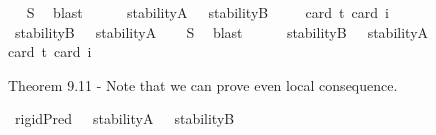 \begin{isabellebody}
\isadelimproof
\ %
\endisadelimproof
%
\isatagproof
{}\isamarkupfalse%
\ S{}\ \isamarkupfalse%
\ blast%
\endisatagproof
{\isafoldproof}%
%
\isadelimproof
%
\endisadelimproof
\ \ \ \ \isanewline
{}\isamarkupfalse%
\ {\isachardoublequoteopen}{\isasymlfloor}stabilityA\ {\isacharparenleft}{\isasymtau}{\isacharcolon}{\isacharcolon}{\isasymup}{\isasymlangle}{\isasymzero}{\isasymrangle}{\isacharparenright}\ \isactrlbold {\isasymrightarrow}\ stabilityB\ {\isasymtau}{\isasymrfloor}{\isachardoublequoteclose}\ \isanewline
\ \ \isamarkupfalse%
{\isacharbrackleft}card\ {\isacharprime}t{\isacharequal}{}{\isacharcomma}\ card\ i{\isacharequal}{}{\isacharbrackright}%
\isadelimproof
\ %
\endisadelimproof
%
\isatagproof
{}\isamarkupfalse%
\ %
%
\endisatagproof
{\isafoldproof}%
%
\isadelimproof
%
\endisadelimproof
\isanewline
\ \ \ \ \isanewline
{}\isamarkupfalse%
\ {\isachardoublequoteopen}{\isasymlfloor}stabilityB\ {\isacharparenleft}{\isasymtau}{\isacharcolon}{\isacharcolon}{\isasymup}{\isasymlangle}{\isasymzero}{\isasymrangle}{\isacharparenright}{\isasymrfloor}\ {\isasymlongrightarrow}\ {\isasymlfloor}stabilityA\ {\isasymtau}{\isasymrfloor}{\isachardoublequoteclose}%
\isadelimproof
\ %
\endisadelimproof
%
\isatagproof
{}\isamarkupfalse%
\ S{}\ \isamarkupfalse%
\ blast%
\endisatagproof
{\isafoldproof}%
%
\isadelimproof
%
\endisadelimproof
\ \ \ \ \isanewline
{}\isamarkupfalse%
\ {\isachardoublequoteopen}{\isasymlfloor}stabilityB\ {\isacharparenleft}{\isasymtau}{\isacharcolon}{\isacharcolon}{\isasymup}{\isasymlangle}{\isasymzero}{\isasymrangle}{\isacharparenright}\ \isactrlbold {\isasymrightarrow}\ stabilityA\ {\isasymtau}{\isasymrfloor}{\isachardoublequoteclose}\ \isanewline
\ \ \isamarkupfalse%
{\isacharbrackleft}card\ {\isacharprime}t{\isacharequal}{}{\isacharcomma}\ card\ i{\isacharequal}{}{\isacharbrackright}%
\isadelimproof
\ %
\endisadelimproof
%
\isatagproof
{}\isamarkupfalse%
\ %
%
\endisatagproof
{\isafoldproof}%
%
\isadelimproof
%
\endisadelimproof
%
\begin{isamarkuptext}%
Theorem 9.11 - Note that we can prove even local consequence.%
\end{isamarkuptext}\isamarkuptrue%
\isamarkupfalse%
\ {\isachardoublequoteopen}{\isasymlfloor}rigidPred\ {\isacharparenleft}{\isasymtau}{\isacharcolon}{\isacharcolon}{\isasymup}{\isasymlangle}{\isasymzero}{\isasymrangle}{\isacharparenright}\ \isactrlbold {\isasymleftrightarrow}\ {\isacharparenleft}stabilityA\ {\isasymtau}\ \isactrlbold {\isasymand}\ stabilityB\ {\isasymtau}{\isacharparenright}{\isasymrfloor}{\isachardoublequoteclose}%

\end{isabellebody}
